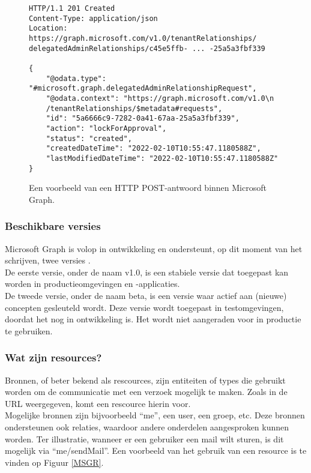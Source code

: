 \begin{figure}[h]
    \footnotesize\begin{verbatim}
HTTP/1.1 201 Created
Content-Type: application/json
Location: https://graph.microsoft.com/v1.0/tenantRelationships/
delegatedAdminRelationships/c45e5ffb- ... -25a5a3fbf339

{
    "@odata.type": "#microsoft.graph.delegatedAdminRelationshipRequest",
    "@odata.context": "https://graph.microsoft.com/v1.0\n
    /tenantRelationships/$metadata#requests",
    "id": "5a6666c9-7282-0a41-67aa-25a5a3fbf339",
    "action": "lockForApproval",
    "status": "created",
    "createdDateTime": "2022-02-10T10:55:47.1180588Z",
    "lastModifiedDateTime": "2022-02-10T10:55:47.1180588Z"
}
    \end{verbatim}    
    \caption[Voorbeeld Microsoft Graph POST-antwoord]{Een voorbeeld van een \ac{HTTP} POST-antwoord binnen Microsoft Graph.}
    \label{MSPRES}
\end{figure}

\subsubsection{Beschikbare versies}

Microsoft Graph is volop in ontwikkeling en ondersteunt, op dit moment van het schrijven, twee versies \Autocite{Microsoft2023f}. \\

De eerste versie, onder de naam v1.0, is een stabiele versie dat toegepast kan worden in productieomgevingen en -applicaties. \\

De tweede versie, onder de naam beta, is een versie waar actief aan (nieuwe) concepten gesleuteld wordt. Deze versie wordt toegepast in testomgevingen, doordat het nog in ontwikkeling is. Het wordt niet aangeraden voor in productie te gebruiken. 

\subsubsection{Wat zijn resources?}

Bronnen, of beter bekend als rescources, zijn entiteiten of types die gebruikt worden om de communicatie met een verzoek mogelijk te maken. Zoals in de \ac{URL} weergegeven, komt een rescource hierin voor. \\

Mogelijke bronnen zijn bijvoorbeeld “me”, een user, een groep, etc. Deze bronnen ondersteunen ook relaties, waardoor andere onderdelen aangesproken kunnen worden. Ter illustratie, wanneer er een gebruiker een mail wilt sturen, is dit mogelijk via “me/sendMail”. Een voorbeeld van het gebruik van een resource is te vinden op Figuur \ref{MSGR}. \\


